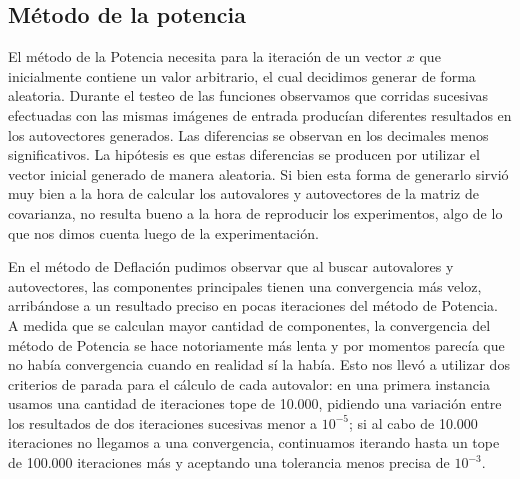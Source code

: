 \subsection*{Método de la potencia}
El método de la Potencia necesita para la iteración de un vector $x$ que inicialmente contiene un valor arbitrario, el cual decidimos generar de forma aleatoria. Durante el testeo de las funciones observamos que corridas sucesivas efectuadas con las mismas imágenes de entrada producían diferentes resultados en los autovectores generados. Las diferencias se observan en los decimales menos significativos. La hipótesis es que estas diferencias se producen por utilizar el vector inicial generado de manera aleatoria. Si bien esta forma de generarlo sirvió muy bien a la hora de calcular los autovalores y autovectores de la matriz de covarianza, no resulta bueno a la hora de reproducir los experimentos, algo de lo que nos dimos cuenta luego de la experimentación.
\par En el método de Deflación pudimos observar que al buscar autovalores y autovectores, las componentes principales tienen una convergencia más veloz, arribándose a un resultado preciso en pocas iteraciones del método de Potencia. A medida que se calculan mayor cantidad de componentes, la convergencia del método de Potencia se hace notoriamente más lenta y por momentos parecía que no había convergencia cuando en realidad sí la había. Esto nos llevó a utilizar dos criterios de parada para el cálculo de cada autovalor: en una primera instancia usamos una cantidad de iteraciones tope de 10.000, pidiendo una variación entre los resultados de dos iteraciones sucesivas menor a $10^{-5}$; si al cabo de 10.000 iteraciones no llegamos a una convergencia, continuamos iterando hasta un tope de 100.000 iteraciones más y aceptando una tolerancia menos precisa de $10^{-3}$.


